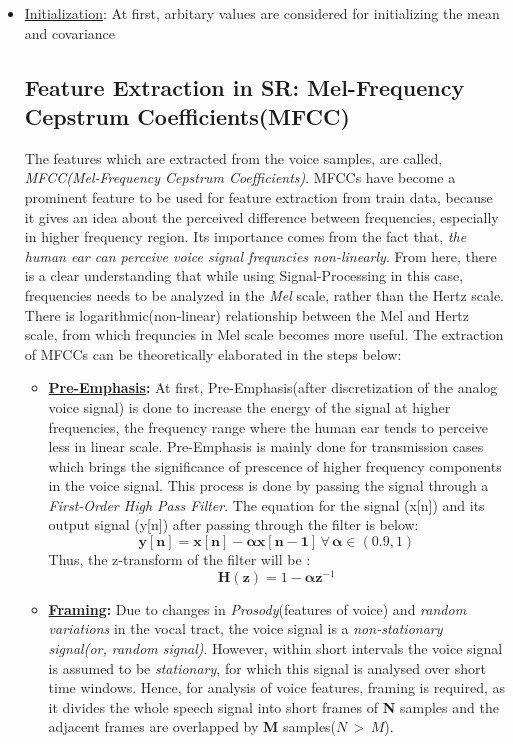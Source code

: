 \documentclass{article}
\begin{document}
\begin{itemize}
\item \underline{Initialization}: At first, arbitary values are considered for initializing the mean and covariance 

\subsection{Feature Extraction in SR: Mel-Frequency Cepstrum Coefficients(MFCC)}
The features which are extracted from the voice samples, are called, \textit{MFCC(Mel-Frequency Cepstrum Coefficients)}. MFCCs have become a prominent feature to be used for feature extraction from train data, because it gives an idea about the perceived difference between frequencies, especially in higher frequency region. Its importance comes from the fact that, \textit{the human ear can perceive voice signal frequncies non-linearly}. From here, there is a clear understanding that while using Signal-Processing in this case, frequencies needs to be analyzed in the \textit{Mel} scale, rather than the {Hertz} scale. There is logarithmic(non-linear) relationship between the Mel and Hertz scale, from which frequncies in Mel scale becomes more useful. The extraction of MFCCs can be theoretically elaborated in the steps below:
\begin{itemize}
\item \textbf{\underline{Pre-Emphasis}:} At first, Pre-Emphasis(after discretization of the analog voice signal) is done to increase the energy of the signal at higher frequencies, the frequency range where the human ear tends to perceive less in linear scale. Pre-Emphasis is mainly done for transmission cases which brings the significance of prescence of higher frequency components in the voice signal. This process is done by passing the signal through a \textit{First-Order High Pass Filter}. The equation for the signal (x[n]) and its output signal (y[n]) after passing through the filter is below:
\begin{equation}
\bm{y[n]} = \bm{x[n]} - \bm{\alpha x[n-1]} \, \forall\, \bm{\alpha}\in (0.9,1) 
\end{equation}
Thus, the z-transform of the filter will be :
\begin{equation}
\bm{H(z)} = 1-\bm{\alpha z}^{-1}
\end{equation}
\item \textbf{\underline{Framing}:} Due to changes in \textit{Prosody}(features of voice) and \textit{random variations} in the vocal tract, the voice signal is a \textit{non-stationary signal(or, random signal)}. However, within short intervals the voice signal is assumed to be \textit{stationary}, for which this signal is analysed over short time windows. Hence, for analysis of voice features, framing is required, as it divides the whole speech signal into short frames of \textbf{N} samples and the adjacent frames are overlapped by \textbf{M} samples($N\,>\,M$).

\end{itemize}
\end{itemize}
\end{document}
